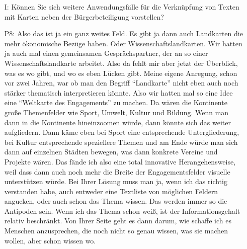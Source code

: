 \begin{itemize}
    \item[I:] K{\"o}nnen Sie sich weitere Anwendungsf{\"a}lle f{\"u}r die Verkn{\"u}pfung von Texten mit Karten neben der B{\"u}rgerbeteiligung vorstellen?
    \item[P8:] Also das ist ja ein ganz weites Feld. Es gibt ja dann auch Landkarten die mehr {\"o}konomische Bez{\"u}ge haben. Oder Wissenschaftslandkarten. Wir hatten ja auch mal einen gemeinsamen Gespr{\"a}chspartner, der an so einer Wissenschaftslandkarte arbeitet. Also da fehlt mir aber jetzt der {\"U}berblick, was es wo gibt, und wo es eben L{\"u}cken gibt. Meine eigene Anregung, schon vor zwei Jahren, war ob man den Begriff "`Landkarte"' nicht eben auch noch st{\"a}rker thematisch interpretieren k{\"o}nnte. Also wir hatten mal so eine Idee eine "`Weltkarte des Engagements"' zu machen. Da w{\"a}ren die Kontinente gro{\ss}e Themenfelder wie Sport, Umwelt, Kultur und Bildung. Wenn man dann in die Kontinente hineinzoomen w{\"u}rde, dann k{\"o}nnte sich das weiter aufgliedern. Dann k{\"a}me eben bei Sport eine entsprechende Untergliederung, bei Kultur entsprechende speziellere Themen und am Ende w{\"u}rde man sich dann auf einzelnen St{\"a}dten bewegen, was dann konkrete Vereine und Projekte w{\"a}ren. Das f{\"a}nde ich also eine total innovative Herangehensweise, weil dass dann auch noch mehr die Breite der Engagementsfelder visuelle unterst{\"u}tzen w{\"u}rde. Bei Ihrer L{\"o}sung muss man ja, wenn ich das richtig verstanden habe, auch entweder eine Textliste von m{\"o}glichen Feldern angucken, oder auch schon das Thema wissen. Das werden immer so die Antipoden sein. Wenn ich das Thema schon wei{\ss}, ist der Informationsgehalt relativ beschr{\"a}nkt. Von Ihrer Seite geht es dann darum, wie schaffe ich es Menschen anzusprechen, die noch nicht so genau wissen, was sie machen wollen, aber schon wissen wo. 
\end{itemize}

